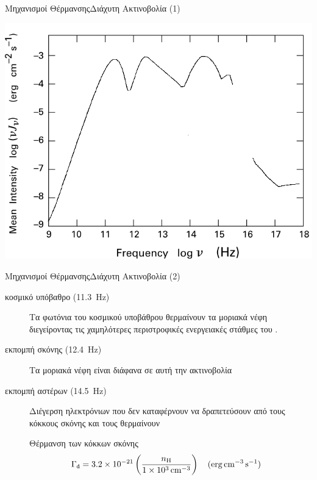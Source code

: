 \documentclass{beamer}
\begin{document}
\begin{frame}{Μηχανισμοί Θέρμανσης}{Διάχυτη Ακτινοβολία (1)}
	\begin{center}
			\includegraphics[width=0.7\linewidth]{../Document/Images/interstellarradiation}
	\end{center}
\end{frame}

\begin{frame}{Μηχανισμοί Θέρμανσης}{Διάχυτη Ακτινοβολία (2)}
	\begin{description}
		\item[κοσμικό υπόβαθρο (\SI{11.3}{Hz})]{Τα φωτόνια του κοσμικού υποβάθρου θερμαίνουν τα μοριακά νέφη διεγείροντας τις χαμηλότερες περιστροφικές ενεργειακές στάθμες του .}
		\item[εκπομπή σκόνης (\SI{12.4}{Hz})]{Τα μοριακά νέφη είναι διάφανα σε αυτή την ακτινοβολία}
		\item[εκπομπή αστέρων (\SI{14.5}{Hz})]{Διέγερση ηλεκτρόνιων που δεν καταφέρνουν να δραπετεύσουν από τους κόκκους σκόνης και τους θερμαίνουν}
		 \begin{block}{Θέρμανση των κόκκων σκόνης}
		 	\begin{equation}
		 	\Gamma _\mathtt{d} = \num{3.2e-21} \left( \frac{n_{\ce{H}}}{\SI{1e3}{cm^{-3}}} \right) \qq{(\si{erg.cm^{-3}.s^{-1}})} 
		 	\end{equation} 	
		 \end{block}	
	\end{description}
\end{frame}
\end{document}
